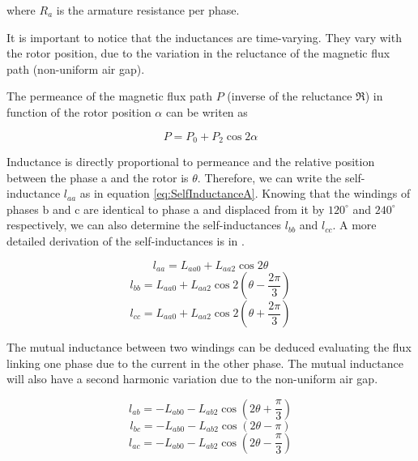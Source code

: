 where $R_a$ is the armature resistance per phase.

It is important to notice that the inductances are time-varying. They vary with the rotor position, due to the variation in the reluctance of the magnetic flux path (non-uniform air gap). 

The permeance of the magnetic flux path $P$ (inverse of the reluctance $\Re$) in function of the rotor position $\alpha$ can be writen as

\begin{equation}
	P = P_0 + P_2 \cos 2 \alpha
\end{equation}

Inductance is directly proportional to permeance and the relative position between the phase a and the rotor is $\theta$. Therefore, we can write the self-inductance $l_{aa}$ as in equation \ref{eq:SelfInductanceA}. Knowing that the windings of phases b and c are identical to phase a and displaced from it by  $120^{\circ}$ and $240^{\circ}$ respectively, we can also determine the self-inductances $l_{bb}$ and $l_{cc}$. A more detailed derivation of the self-inductances is in \cite{kundur1994power}.

\begin{equation} \label{eq:SelfInductanceA}
	l_{aa} = L_{aa0} + L_{aa2} \cos 2 \theta
\end{equation}
\begin{equation} \label{eq:SelfInductanceA}
	l_{bb} = L_{aa0} + L_{aa2} \cos 2 (\theta - \frac{2 \pi}{3})
\end{equation}
\begin{equation} \label{eq:SelfInductanceA}
	l_{cc} = L_{aa0} + L_{aa2} \cos 2 (\theta + \frac{2 \pi}{3})
\end{equation}

The mutual inductance between two windings can be deduced evaluating the flux linking one phase due to the current in the other phase. The mutual inductance will also have a second harmonic variation due to the non-uniform air gap.

\begin{equation} \label{eq:SelfInductanceA}
	l_{ab} = -L_{ab0} - L_{ab2} \cos (2 \theta + \frac{\pi}{3})
\end{equation}
\begin{equation} \label{eq:SelfInductanceA}
	l_{bc} = -L_{ab0} - L_{ab2} \cos (2 \theta - \pi)
\end{equation}
\begin{equation} \label{eq:SelfInductanceA}
	l_{ac} = - L_{ab0} - L_{ab2} \cos (2 \theta - \frac{\pi}{3})
\end{equation}

